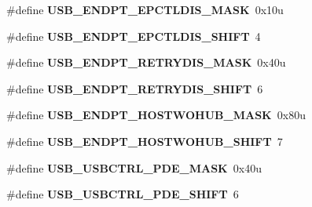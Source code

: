 \begin{DoxyCompactItemize}
\item 
\hypertarget{group___u_s_b___register___masks_ga07f43f2be7e974a763e86087f47e14d6}{}\#define {\bfseries U\+S\+B\+\_\+\+E\+N\+D\+P\+T\+\_\+\+E\+P\+C\+T\+L\+D\+I\+S\+\_\+\+M\+A\+S\+K}~0x10u\label{group___u_s_b___register___masks_ga07f43f2be7e974a763e86087f47e14d6}

\item 
\hypertarget{group___u_s_b___register___masks_ga0607b1ed419fd16c0c3635042ff33fd4}{}\#define {\bfseries U\+S\+B\+\_\+\+E\+N\+D\+P\+T\+\_\+\+E\+P\+C\+T\+L\+D\+I\+S\+\_\+\+S\+H\+I\+F\+T}~4\label{group___u_s_b___register___masks_ga0607b1ed419fd16c0c3635042ff33fd4}

\item 
\hypertarget{group___u_s_b___register___masks_ga116b045c1163bccc05a270beb6ee2f3d}{}\#define {\bfseries U\+S\+B\+\_\+\+E\+N\+D\+P\+T\+\_\+\+R\+E\+T\+R\+Y\+D\+I\+S\+\_\+\+M\+A\+S\+K}~0x40u\label{group___u_s_b___register___masks_ga116b045c1163bccc05a270beb6ee2f3d}

\item 
\hypertarget{group___u_s_b___register___masks_ga7d07ae7b5369ee4cbfa19194ebc2e143}{}\#define {\bfseries U\+S\+B\+\_\+\+E\+N\+D\+P\+T\+\_\+\+R\+E\+T\+R\+Y\+D\+I\+S\+\_\+\+S\+H\+I\+F\+T}~6\label{group___u_s_b___register___masks_ga7d07ae7b5369ee4cbfa19194ebc2e143}

\item 
\hypertarget{group___u_s_b___register___masks_ga34644591d90c80611273ef5561529c34}{}\#define {\bfseries U\+S\+B\+\_\+\+E\+N\+D\+P\+T\+\_\+\+H\+O\+S\+T\+W\+O\+H\+U\+B\+\_\+\+M\+A\+S\+K}~0x80u\label{group___u_s_b___register___masks_ga34644591d90c80611273ef5561529c34}

\item 
\hypertarget{group___u_s_b___register___masks_ga3d502bcb3115f9bc7918b5fc67d42337}{}\#define {\bfseries U\+S\+B\+\_\+\+E\+N\+D\+P\+T\+\_\+\+H\+O\+S\+T\+W\+O\+H\+U\+B\+\_\+\+S\+H\+I\+F\+T}~7\label{group___u_s_b___register___masks_ga3d502bcb3115f9bc7918b5fc67d42337}

\item 
\hypertarget{group___u_s_b___register___masks_ga7fb8345a32022ec5df5129278d1aed30}{}\#define {\bfseries U\+S\+B\+\_\+\+U\+S\+B\+C\+T\+R\+L\+\_\+\+P\+D\+E\+\_\+\+M\+A\+S\+K}~0x40u\label{group___u_s_b___register___masks_ga7fb8345a32022ec5df5129278d1aed30}

\item 
\hypertarget{group___u_s_b___register___masks_gaaf556df66acd4f6ff2bc1f4fad1a05ed}{}\#define {\bfseries U\+S\+B\+\_\+\+U\+S\+B\+C\+T\+R\+L\+\_\+\+P\+D\+E\+\_\+\+S\+H\+I\+F\+T}~6\label{group___u_s_b___register___masks_gaaf556df66acd4f6ff2bc1f4fad1a05ed}


\end{DoxyCompactItemize}
